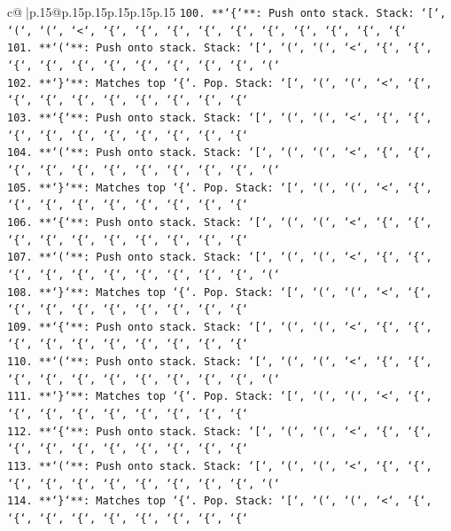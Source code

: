 \documentclass{article}
\begin{document}
{\begin{supertabular}{c@{$\;$}|p{.15\linewidth}@{}p{.15\linewidth}p{.15\linewidth}p{.15\linewidth}p{.15\linewidth}p{.15\linewidth}}
{{{\texttt{100. **`\{`**: Push onto stack. Stack: `{[}`, `(`, `(`, `<`, `\{`, `\{`, `\{`, `\{`, `\{`, `\{`, `\{`, `\{`, `\{`, `\{`} \\
\texttt{101. **`(`**: Push onto stack. Stack: `{[}`, `(`, `(`, `<`, `\{`, `\{`, `\{`, `\{`, `\{`, `\{`, `\{`, `\{`, `\{`, `\{`, `(`} \\
\texttt{102. **`\}`**: Matches top `\{`. Pop. Stack: `{[}`, `(`, `(`, `<`, `\{`, `\{`, `\{`, `\{`, `\{`, `\{`, `\{`, `\{`, `\{`} \\
\texttt{103. **`\{`**: Push onto stack. Stack: `{[}`, `(`, `(`, `<`, `\{`, `\{`, `\{`, `\{`, `\{`, `\{`, `\{`, `\{`, `\{`, `\{`} \\
\texttt{104. **`(`**: Push onto stack. Stack: `{[}`, `(`, `(`, `<`, `\{`, `\{`, `\{`, `\{`, `\{`, `\{`, `\{`, `\{`, `\{`, `\{`, `(`} \\
\texttt{105. **`\}`**: Matches top `\{`. Pop. Stack: `{[}`, `(`, `(`, `<`, `\{`, `\{`, `\{`, `\{`, `\{`, `\{`, `\{`, `\{`, `\{`} \\
\texttt{106. **`\{`**: Push onto stack. Stack: `{[}`, `(`, `(`, `<`, `\{`, `\{`, `\{`, `\{`, `\{`, `\{`, `\{`, `\{`, `\{`, `\{`} \\
\texttt{107. **`(`**: Push onto stack. Stack: `{[}`, `(`, `(`, `<`, `\{`, `\{`, `\{`, `\{`, `\{`, `\{`, `\{`, `\{`, `\{`, `\{`, `(`} \\
\texttt{108. **`\}`**: Matches top `\{`. Pop. Stack: `{[}`, `(`, `(`, `<`, `\{`, `\{`, `\{`, `\{`, `\{`, `\{`, `\{`, `\{`, `\{`} \\
\texttt{109. **`\{`**: Push onto stack. Stack: `{[}`, `(`, `(`, `<`, `\{`, `\{`, `\{`, `\{`, `\{`, `\{`, `\{`, `\{`, `\{`, `\{`} \\
\texttt{110. **`(`**: Push onto stack. Stack: `{[}`, `(`, `(`, `<`, `\{`, `\{`, `\{`, `\{`, `\{`, `\{`, `\{`, `\{`, `\{`, `\{`, `(`} \\
\texttt{111. **`\}`**: Matches top `\{`. Pop. Stack: `{[}`, `(`, `(`, `<`, `\{`, `\{`, `\{`, `\{`, `\{`, `\{`, `\{`, `\{`, `\{`} \\
\texttt{112. **`\{`**: Push onto stack. Stack: `{[}`, `(`, `(`, `<`, `\{`, `\{`, `\{`, `\{`, `\{`, `\{`, `\{`, `\{`, `\{`, `\{`} \\
\texttt{113. **`(`**: Push onto stack. Stack: `{[}`, `(`, `(`, `<`, `\{`, `\{`, `\{`, `\{`, `\{`, `\{`, `\{`, `\{`, `\{`, `\{`, `(`} \\
\texttt{114. **`\}`**: Matches top `\{`. Pop. Stack: `{[}`, `(`, `(`, `<`, `\{`, `\{`, `\{`, `\{`, `\{`, `\{`, `\{`, `\{`, `\{`} \\
}}}
\end{supertabular}}
\end{document}
